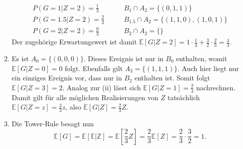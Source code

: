 \documentclass[a4paper]{article}
\begin{document}
\begin{enumerate}
\begin{align*}
        P(G = 1 | Z = 2) = \frac{1}{3} & \qquad B_{1} \cap A_2= \{(0,1,1)\}\\
        P(G = 1.5 | Z = 2) = \frac{2}{3} & \qquad B_{1.5} \cap A_2= \{(1,1,0), (1,0,1)\}\\
        P(G = 2 | Z = 2) = \frac{0}{3} & \qquad B_2 \cap A_2= \{\}
    \end{align*}
    Der zugehörige Erwartungswert ist damit $\mathds{E}[G | Z = 2] = 1 \cdot \frac{1}{3} + \frac{3}{2} \cdot \frac{2}{3} = \frac{4}{3}$.
    \item Es ist $A_0 = \{(0,0,0)\}$. Dieses Ereignis ist nur in $B_{0}$ enthalten, womit $\mathds{E}[G|Z=0] = 0$ folgt.
    Ebenfalls gilt $A_3 = \{(1,1,1)\}$. Auch hier liegt nur ein einziges Ereignis vor, dass nur in $B_{2}$ enthalten ist. Somit folgt $\mathds{E}[G | Z = 3] = 2$.
    Analog zur (ii) lässt sich $\mathds{E}[G|Z=1] = \frac{2}{3}$ nachrechnen. Damit gilt für alle möglichen Realisierungen von $Z$ tatsächlich $\mathds{E}[G|Z = z] = \frac{2}{3} z$, also $\mathds{E}[G|Z] = \frac{2}{3}Z$.
    \item Die Tower-Rule besagt nun 
    \begin{equation*}
        \mathds{E}[G] = \mathds{E}[\mathds{E|Z}] = \mathds{E}[\frac{2}{3}Z] = \frac{2}{3} \mathds{E}[Z] = \frac{2}{3} \cdot \frac{3}{2} = 1\text{.}
    \end{equation*}
\end{enumerate}

\subsection{}
\end{document}
